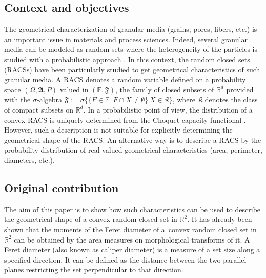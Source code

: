 \documentclass[numbers,compress,v1.0.1]{vmsta}
\theoremstyle{definition}
\begin{document}
\subsection{Context and objectives}
\sloppy The geometrical characterization of granular media (grains,
pores, fibers, etc.) is an important issue in materials and process
sciences. Indeed, several granular media can be modeled as random sets
where the heterogeneity of the particles is studied with a
probabilistic approach \citep{theseGalerne,thesepeyrega}. In this
context, the random closed sets (RACSs) have been particularly studied
\citep
{torquato2002random,molch95,chiu2013stochastic,ballanisurfacepaircorel}
to get geometrical characteristics of such granular media. A RACS
denotes a random variable defined on a probability space $ (\varOmega
,\mathfrak{A},P)$ valued in $(\mathbb{F},\mathfrak{F})$, the family of
closed subsets of $\mathbb{R}^d$
provided with the $\sigma$-algebra $\mathfrak{F}:=\sigma\lbrace\lbrace
F\in\mathbb{F}\ \vert F\cap X\neq\emptyset\rbrace\,X\in\mathfrak
{K}\rbrace$, where $\mathfrak{K}$ denotes the class of compact subsets
on $\mathbb{R}^d$.
In a probabilistic point of view, the distribution of a convex RACS is
uniquely determined from the Choquet capacity functional \citep
{molchanov1994asymptotic,heinrich1999central}.
However, such a description is not suitable for explicitly determining
the geometrical shape of the RACS. An alternative way is to describe a
RACS by the probability distribution of real-valued geometrical
characteristics (area, perimeter, diameters, etc.).

\subsection{Original contribution}

The aim of this paper is to show how such characteristics can be used
to describe the geometrical shape of a convex random closed set in
$\mathbb{R}^2$. It has already been shown \cite{GSI} that the moments
of the Feret diameter of a~convex random closed set in $\mathbb{R}^2$
can be obtained by the area measures on morphological transforms of it.
A Feret diameter (also known as caliper diameter) is a measure of a set
size along a specified direction. It can be defined as the distance
between the two parallel planes restricting the set perpendicular to
that direction.
\end{document}
